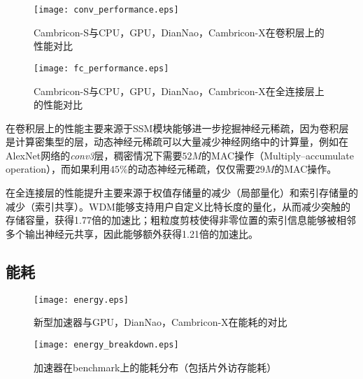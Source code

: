 \begin{figure}[h]
\centering
\texttt{[image: conv\_performance.eps]}
\caption{Cambricon-S与CPU，GPU，DianNao，Cambricon-X在卷积层上的性能对比}
\label{fig:conv_performance}
\end{figure}

\begin{figure}[h]
\centering
\texttt{[image: fc\_performance.eps]}
\caption{Cambricon-S与CPU，GPU，DianNao，Cambricon-X在全连接层上的性能对比}
\label{fig:fc_performance}
\end{figure}


在卷积层上的性能主要来源于SSM模块能够进一步挖掘神经元稀疏，因为卷积层是计算密集型的层，动态神经元稀疏可以大量减少神经网络中的计算量，例如在AlexNet网络的\emph{conv3}层，稠密情况下需要$52M$的MAC操作（Multiply–accumulate operation），而如果利用$45\%$的动态神经元稀疏，仅仅需要$29M$的MAC操作。

在全连接层的性能提升主要来源于权值存储量的减少（局部量化）和索引存储量的减少（索引共享）。WDM能够支持用户自定义比特长度的量化，从而减少突触的存储容量，获得1.77倍的加速比；粗粒度剪枝使得非零位置的索引信息能够被相邻多个输出神经元共享，因此能够额外获得1.21倍的加速比。


\subsection{能耗}
\begin{figure}[h]
\centering
\texttt{[image: energy.eps]}
\caption{新型加速器与GPU，DianNao，Cambricon-X在能耗的对比}
\label{fig:energy}
\end{figure}



\begin{figure}[h]
\centering
\texttt{[image: energy\_breakdown.eps]}
\caption{加速器在benchmark上的能耗分布（包括片外访存能耗）}
\label{fig:energy_breakdown}
\end{figure}

